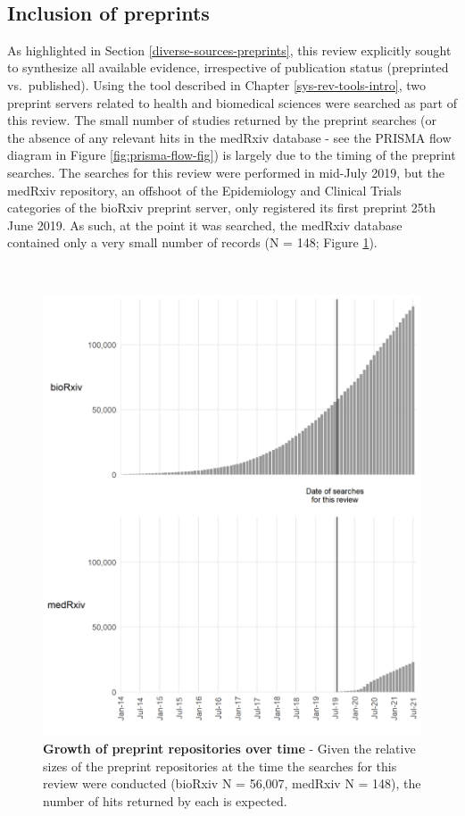 \documentclass[a4paper, twoside]{templates/ociamthesis}
\begin{document}
~

\hypertarget{inclusion-of-preprints}{%
\subsection{Inclusion of preprints}\label{inclusion-of-preprints}}

As highlighted in Section \ref{diverse-sources-preprints}, this review explicitly sought to synthesize all available evidence, irrespective of publication status (preprinted vs.~published). Using the tool described in Chapter \ref{sys-rev-tools-intro}, two preprint servers related to health and biomedical sciences were searched as part of this review. The small number of studies returned by the preprint searches (or the absence of any relevant hits in the medRxiv database - see the PRISMA flow diagram in Figure \ref{fig:prisma-flow-fig}) is largely due to the timing of the preprint searches. The searches for this review were performed in mid-July 2019, but the medRxiv repository, an offshoot of the Epidemiology and Clinical Trials categories of the bioRxiv preprint server, only registered its first preprint 25th June 2019. As such, at the point it was searched, the medRxiv database contained only a very small number of records (N = 148; Figure \ref{fig:preprintGrowth}).

~





\begin{figure}[H]

{\centering \includegraphics[width=0.8\linewidth]{figures/sys-rev/preprint_growth} 

}

\caption[Growth of preprint repositories over time]{\textbf{Growth of preprint repositories over time} - Given the relative sizes of the preprint repositories at the time the searches for this review were conducted (bioRxiv N = 56,007, medRxiv N = 148), the number of hits returned by each is expected.}\label{fig:preprintGrowth}
\end{figure}
\end{document}

